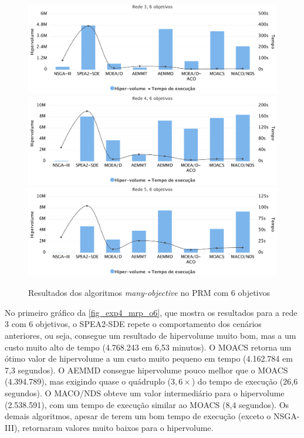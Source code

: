 \begin{figure}[!htbp]	
	\includegraphics[width=1\textwidth]{cap_experimentos/figs/etapa4/r3o6}
	\includegraphics[width=1\textwidth]{cap_experimentos/figs/etapa4/r4o6}
	\includegraphics[width=1\textwidth]{cap_experimentos/figs/etapa4/r5o6}
	\caption{\label{fig_exp4_mrp_o6}Resultados dos algoritmos \textit{many-objective} no PRM com 6 objetivos}
\end{figure}

No primeiro gráfico da \autoref{fig_exp4_mrp_o6}, que mostra os resultados para a rede 3 com 6 objetivos, o SPEA2-SDE repete o comportamento dos cenários anteriores, ou seja, consegue um resultado de hipervolume muito bom, mas a um custo muito alto de tempo (4.768.243 em 6,53 minutos). O MOACS retorna um ótimo valor de hipervolume a um custo muito pequeno em tempo (4.162.784 em 7,3 segundos). O AEMMD consegue hipervolume pouco melhor que o MOACS (4.394.789), mas exigindo quase o quádruplo ($3,6\times$) do tempo de execução (26,6 segundos). O MACO/NDS obteve um valor intermediário para o hipervolume (2.538.591), com um tempo de execução similar ao MOACS (8,4 segundos). Os demais algoritmos, apesar de terem um bom tempo de execução (exceto o NSGA-III), retornaram valores muito baixos para o hipervolume. 

